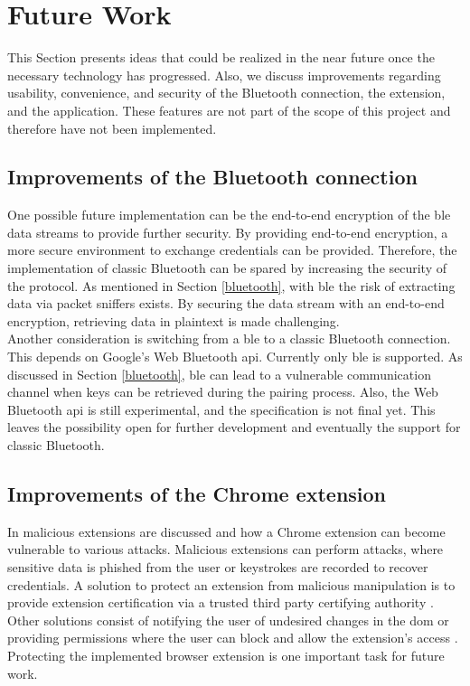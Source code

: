 \section{Future Work} \label{futurework}
This Section presents ideas that could be realized in the near future once the necessary technology has progressed. Also, we discuss improvements regarding usability, convenience, and security of the Bluetooth connection, the extension, and the application. These features are not part of the scope of this project and therefore have not been implemented.

\subsection{Improvements of the Bluetooth connection}
One possible future implementation can be the end-to-end encryption of the \gls{ble} data streams to provide further security. By providing end-to-end encryption, a more secure environment to exchange credentials can be provided. Therefore, the implementation of classic Bluetooth can be spared by increasing the security of the protocol. As mentioned in Section \ref{bluetooth}, with \gls{ble} the risk of extracting data via packet sniffers exists. By securing the data stream with an end-to-end encryption, retrieving data in plaintext is made challenging. \\

Another consideration is switching from a \gls{ble} to a classic Bluetooth connection. This depends on Google's Web Bluetooth \gls{api}. Currently only \gls{ble} is supported. As discussed in Section \ref{bluetooth}, \gls{ble} can lead to a vulnerable communication channel when keys can be retrieved during the pairing process. Also, the Web Bluetooth \gls{api} is still experimental, and the specification is not final yet. This leaves the possibility open for further development and eventually the support for classic Bluetooth.
 
\subsection{Improvements of the Chrome extension}
In \cite{VarshneyBS18} malicious extensions are discussed and how a Chrome extension can become vulnerable to various attacks. Malicious extensions can perform attacks, where sensitive data is phished from the user or keystrokes are recorded to recover credentials. A solution to protect an extension from malicious manipulation is to provide extension certification via a trusted third party certifying authority \cite{VarshneyBS18}. Other solutions consist of notifying the user of undesired changes in the \gls{dom} or providing permissions where the user can block and allow the extension's access \cite{VarshneyBS18}. Protecting the implemented browser extension is one important task for future work. \\

